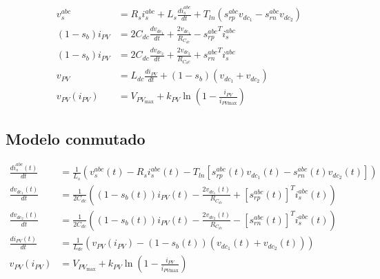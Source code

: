 \documentclass[11pt, a4paper]{article}
\begin{document}
\begin{align*}
    v_s^{abc}&=R_s i_s^{abc}+L_s\frac{di_s^{abc}}{dt}+T_{ln}(s_{rp}^{abc}v_{dc_1}-s_{rn}^{abc}v_{dc_2}) \\ 
    (1-s_b)i_{PV} &= 2C_{dc}\frac{dv_{dc_1}}{dt}+\frac{2v_{dc_1}}{R_{C_{dc}}}-{s_{rp}^{abc}}^Ti_{s}^{abc} \\
    (1-s_b)i_{PV} &= 2C_{dc}\frac{dv_{dc_2}}{dt}+\frac{2v_{dc_2}}{R_{C_dc}}+{s_{rn}^{abc}}^T i_{s}^{abc} \\ 
    v_{PV}&=L_{dc}\frac{di_{PV}}{dt}+(1-s_b)(v_{dc_1}+v_{dc_2}) \\ 
    v_{PV}(i_{PV})&=V_{PV_\text{max}}+k_{PV}\ln\left(1-\frac{i_{PV}}{i_{PV\text{max}}}\right)
\end{align*}
\subsection*{Modelo conmutado}
\begin{align*}
    \frac{d i_{s}^{abc}(t)}{d t} &= \frac{1}{L_{s}} \left( v_{s}^{abc}(t) - R_{s} i_{s}^{abc}(t) - T_{ln} \left[ s_{rp}^{abc}(t) v_{dc_1}(t) - s_{rn}^{abc}(t) v_{dc_2}(t) \right] \right) \\[10pt]
    \frac{d v_{dc_1}(t)}{d t} &= \frac{1}{2 C_{dc}} \left( (1 - s_{b}(t)) i_{PV}(t) - \frac{2 v_{dc_1}(t)}{R_{C_{dc}}} + [s_{rp}^{abc}(t)]^{T} i_{s}^{abc}(t) \right) \\[10pt]
    \frac{d v_{dc_2}(t)}{d t} &= \frac{1}{2 C_{dc}} \left( (1 - s_{b}(t)) i_{PV}(t) - \frac{2 v_{dc_2}(t)}{R_{C_{dc}}} - [s_{rn}^{abc}(t)]^{T} i_{s}^{abc}(t) \right) \\[10pt]
    \frac{d i_{PV}(t)}{d t} &= \frac{1}{L_{dc}} \left( v_{PV}(i_{PV}) - (1 - s_{b}(t)) (v_{dc_1}(t) + v_{dc_2}(t)) \right) \\ 
    v_{PV}(i_{PV})&=V_{PV_\text{max}}+k_{PV}\ln\left(1-\frac{i_{PV}}{i_{PV\text{max}}}\right)
\end{align*}
\end{document}
